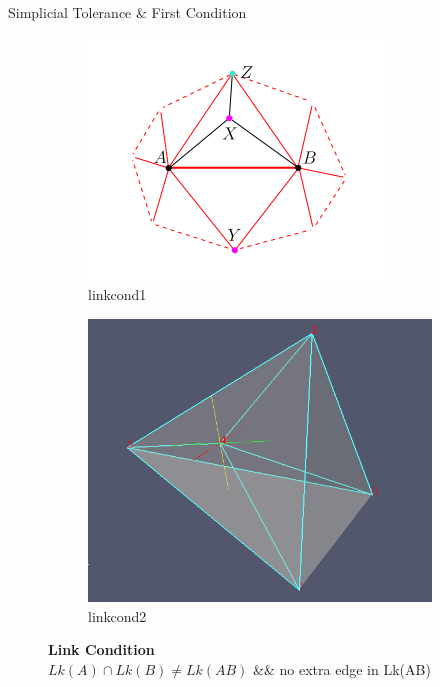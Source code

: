 \documentclass{beamer}
\begin{document}
\begin{frame} {Simplicial Tolerance \& First Condition}
  \begin{figure}[h]
    \begin{subfigure}[b]{0.3\textwidth}
      \includegraphics[width=\textwidth]{linkcond1}
      \caption[1]{linkcond1}
    \end{subfigure}
    \begin{subfigure}[b]{0.3\textwidth}
      \includegraphics[width=\textwidth]{linkcond2}
      \caption[1]{linkcond2}
    \end{subfigure}
    \caption[linkcond]{\textbf{Link Condition}\\$Lk(A) \cap Lk(B) \ne Lk(AB)$ \&\& no extra edge in Lk(AB)}
  \end{figure}
\end{frame}
\end{document}
